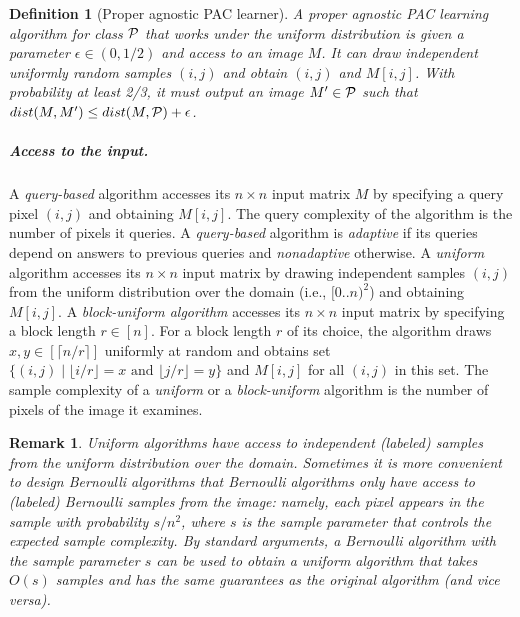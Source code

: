 \documentclass[11pt,english]{article}
\newtheorem{remark}[theorem]{Remark}
\newtheorem{definition}{Definition}[section]
\numberwithin{figure}{section}
\newcommand{\eps}{{\epsilon}}
\newcommand{\dis}{dist}
\newcommand{\integerset}[1]{[0..{#1})}
\newcommand{\side}{r}
\begin{document}
\begin{definition}[Proper agnostic PAC learner]

A proper agnostic PAC learning algorithm for class $\cal P$ that works under the uniform distribution is given a parameter $\eps\in(0,1/2)$ and access to an image $M$. It can draw independent uniformly random samples $(i,j)$  and obtain $(i,j)$ and $M[i,j]$. With probability at least 2/3, it must output an image $M'\in {\cal P}$ such that $\dis(M,M')\leq\dis(M,{\cal P})+\eps$.
\end{definition}
\fi
\subparagraph{Access to the input.}
A {\em query-based} algorithm accesses its $n\times n$ input matrix $M$ by specifying a query pixel $(i,j)$ and obtaining $M[i,j]$.
\ifnum{}
The query complexity of the algorithm is the number of pixels it queries.
A {\em query-based} algorithm is {\em adaptive} if its queries depend on answers to previous queries and {\em nonadaptive} otherwise.
\fi
A {\em uniform} algorithm accesses its $n\times n$ input matrix by drawing independent samples $(i,j)$ from the uniform distribution over the domain (i.e., $\integerset{n}^2$) and obtaining $M[i,j]$.
A {\em block-uniform algorithm} accesses its $n\times n$ input matrix by specifying a block length $\side\in[n]$. For a block length $\side$ of its choice, the algorithm draws $x,y\in[\lceil n/\side\rceil]$ uniformly at random and obtains set $\{(i,j)\mid \lfloor i/\side\rfloor=x\text{ and } \lfloor j/\side\rfloor=y\}$ and $M[i,j]$ for all $(i,j)$ in this set.
The sample complexity of a {\em uniform} or a {\em block-uniform} algorithm is the number of pixels of the image it examines.

\begin{remark}\label{remark:bernoulli}
Uniform algorithms have access to independent (labeled) samples from the uniform distribution over the domain.
\ifnum{}
Sometimes it is more convenient to design
{\em Bernoulli algorithms} that
\else
{\em Bernoulli algorithms}
\fi
only have access to (labeled) Bernoulli samples from the image: namely, each pixel appears in the sample with probability $s/n^2$, where $s$ is the sample parameter that controls the expected sample complexity.
By standard arguments, a Bernoulli algorithm with the sample parameter $s$ can be used to obtain a uniform algorithm that takes $O(s)$ samples and has the same guarantees as the original algorithm (and vice versa).
\end{remark}
\end{document}
